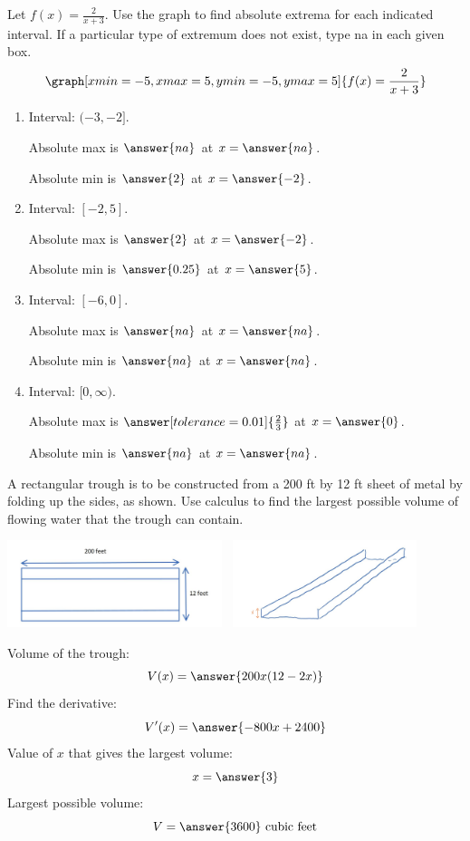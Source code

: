 \documentclass{ximera}
\begin{document}
\begin{problem}\label{prob:240HW8prob2}
Let $f(x)=\frac{2}{x+3}$.  Use the graph to find absolute extrema for each indicated interval.  If a particular type of extremum does not exist, type na in each given box.
\[
\graph[xmin=-5,xmax=5,ymin=-5,ymax=5]{f(x)=\frac{2}{x+3}} 
\]

\begin{enumerate}
    \item Interval: $(-3, -2]$.
    
    Absolute max is $\answer{na}$ at $x=\answer{na}$.
    
    Absolute min is $\answer{2}$ at $x=\answer{-2}$.
    
    \item Interval: $[-2, 5]$.
    
    Absolute max is $\answer{2}$ at $x=\answer{-2}$.
    
    Absolute min is $\answer{0.25}$ at $x=\answer{5}$.
    
    \item Interval: $[-6, 0]$.
    
    Absolute max is $\answer{na}$ at $x=\answer{na}$.
    
    Absolute min is $\answer{na}$ at $x=\answer{na}$.
    
    \item Interval: $[0, \infty)$.
    
    Absolute max is $\answer[tolerance=0.01]{\frac{2}{3}}$ at $x=\answer{0}$.
    
    Absolute min is $\answer{na}$ at $x=\answer{na}$.
\end{enumerate}
\end{problem}

\begin{problem}\label{prob:mth240HW8prob3}
A rectangular trough is to be constructed from a 200 ft by 12 ft sheet of metal by folding up the sides, as shown.  Use calculus to find the largest possible volume of flowing water that the trough can contain.

\begin{image}
   
\includegraphics[height=1in]{test2image2new.jpg}~
\includegraphics[height=1in]{Inkedtest2image3.jpg}~

\end{image}
Volume of the trough:
$$V(x)=\answer{200x(12-2x)}$$
Find the derivative:
$$V'(x)=\answer{-800x+2400}$$
Value of $x$ that gives the largest volume:
$$x=\answer{3}$$
Largest possible volume:
$$V=\answer{3600}\mbox{ cubic feet}$$

\end{problem}
\end{document}
